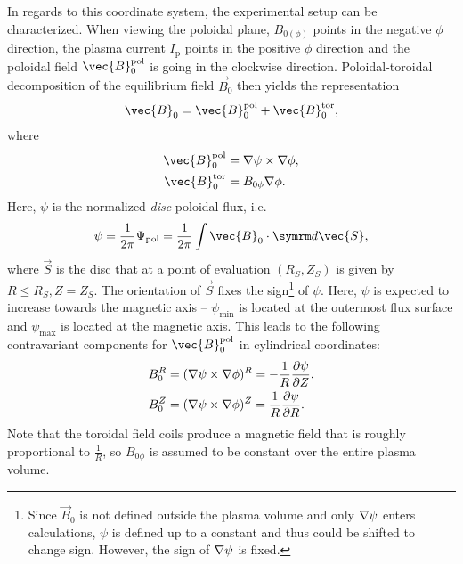 In regards to this coordinate system, the experimental setup can be characterized. When viewing the poloidal plane, $B_{0 (\phi)}$ points in the negative $\phi$ direction, the plasma current $I_{\text{p}}$ points in the positive $\phi$ direction and the poloidal field $\vec{B}_{0}^{\pol}$ is going in the clockwise direction. Poloidal-toroidal decomposition of the equilibrium field $\vec{B}_{0}$ then yields the representation
\begin{gather}
  \vec{B}_{0} = \vec{B}_{0}^{\pol} + \vec{B}_{0}^{\tor}, \label{eq:B_pol_tor}
\end{gather}
where 
\begin{align}
  \vec{B}_{0}^{\pol} &= \grad \psi \times \grad \phi, \label{eq:B_pol} \\
  \vec{B}_{0}^{\tor} &= B_{0 \phi} \grad \phi. \label{eq:B_tor}
\end{align}
Here, $\psi$ is the normalized \emph{disc} poloidal flux, i.e.
\begin{gather}
  \psi = \frac{1}{2 \pi} \Psi_{\pol} = \frac{1}{2 \pi} \int \vec{B}_{0} \cdot \diff \vec{S},
\end{gather}
where $\vec{S}$ is the disc that at a point of evaluation $(R_{S}, Z_{S})$ is given by $R \leq R_{S}, Z = Z_{S}$. The orientation of $\vec{S}$ fixes the sign\footnote{Since $\vec{B}_{0}$ is not defined outside the plasma volume and only $\nabla \psi$ enters calculations, $\psi$ is defined up to a constant and thus could be shifted to change sign. However, the sign of $\nabla \psi$ is fixed.} of $\psi$. Here, $\psi$ is expected to increase towards the magnetic axis -- $\psi_{\text{min}}$ is located at the outermost flux surface and $\psi_{\text{max}}$ is located at the magnetic axis. This leads to the following contravariant components for $\vec{B}_{0}^{\pol}$ in cylindrical coordinates:
\begin{align}
  B_{0}^{R} &= (\grad \psi \times \grad \phi)^{R} = -\frac{1}{R} \pd[\psi]{Z}, \label{eq:B0R} \\
  B_{0}^{Z} &= (\grad \psi \times \grad \phi)^{Z} = \frac{1}{R} \pd[\psi]{R}. \label{eq:B0Z}
\end{align}
Note that the toroidal field coils produce a magnetic field that is roughly proportional to $\frac{1}{R}$, so $B_{0 \phi}$ is assumed to be constant over the entire plasma volume.

